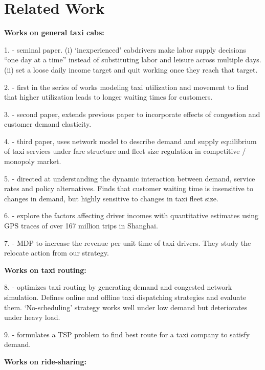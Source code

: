 
\section{Related Work}
\label{sec:related_work}
\textbf{Works on general taxi cabs:}

1. \citeauthor{camerer1997labor} - seminal paper. (i) `inexperienced' cabdrivers make labor supply decisions ``one day at a time'' instead of substituting labor and leisure across multiple days. (ii) set a loose daily income target and quit working once they reach that target.

2. \citeauthor{yang1998network} - first in the series of works modeling taxi utilization and movement to find that higher utilization leads to longer waiting times for customers.

3. \citeauthor{wong2001modeling} - second paper, extends previous paper to incorporate effects of congestion and customer demand elasticity. 

4. \citeauthor{yang2002demand} - third paper, uses network model to describe demand and supply equilibrium of taxi services under fare structure and fleet size regulation in competitive / monopoly market.

5. \citeauthor{bailey1987simulation} - directed at understanding the dynamic interaction between demand, service rates and policy alternatives. Finds that customer waiting time is insensitive to changes in demand, but highly sensitive to changes in taxi fleet size.

6. \citeauthor{qin2017mining} - explore the factors affecting driver incomes with quantitative estimates using GPS traces of over 167 million trips in Shanghai.

7. \citeauthor{rong2016rich} - MDP to increase the revenue per unit time of taxi drivers. They study the relocate action from our strategy.

\textbf{Works on taxi routing:}

8. \citeauthor{maciejewski2013simulation} - optimizes taxi routing by generating demand and congested network simulation. Defines online and offline taxi dispatching strategies and evaluate them. `No-scheduling' strategy works well under low demand but deteriorates under heavy load.

9. \citeauthor{nunes2011taxi} - formulates a TSP problem to find best route for a taxi company to satisfy demand.

\textbf{Works on ride-sharing:}

